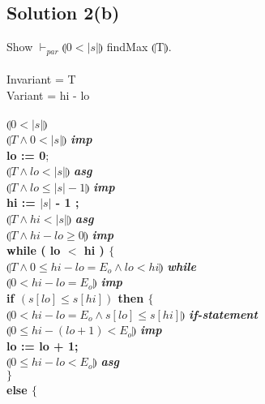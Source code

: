 \documentclass[12pt]{article}
\newcommand\abs[1]{\left|#1\right|}
\begin{document}
\subsection*{Solution 2(b)}
Show $\vdash_{par} \limg 0 < \abs{s} \rimg$ findMax $\limg $T$ \rimg$. \\ \\
Invariant = T \\
Variant = hi - lo \\ \\
$\limg 0 < \abs{s} \rimg$ 	\\
$\limg T \land 0 < \abs{s} \rimg$ \textit{\textbf{imp}} \\ 					
\textbf{lo := 0};  \\
$\limg T \land lo < \abs{s} \rimg$	\textit{\textbf{asg}}\\
$\limg T \land lo \leq \abs{s} - 1 \rimg$	\textit{\textbf{imp}}\\
\textbf{hi := $\abs{s}$ - 1 ;} \\
$\limg T \land hi < \abs{s} \rimg$	\textit{\textbf{asg}}\\
$\limg T \land hi - lo \geq 0 \rimg$ \textit{\textbf{imp}}\\
\textbf{while ( lo $<$ hi ) $\{$} \\
\hspace*{10mm}$\limg T \land 0 \leq hi - lo = E_o \land lo < hi \rimg$ \textit{\textbf{while}}\\
\hspace*{10mm}$\limg 0 < hi - lo = E_o \rimg$ \textit{\textbf{imp}}\\
\hspace*{10mm}\textbf{if $(s[lo] \leq s[hi])$ then $\{$} \\
\hspace*{20mm}$\limg 0 < hi - lo = E_o \land s[lo] \leq s[hi] \rimg$ \textit{\textbf{if-statement}}\\
\hspace*{20mm}$\limg 0 \leq hi - (lo + 1) < E_o \rimg$ \textit{\textbf{imp}}\\
\hspace*{20mm}\textbf{lo := lo + 1;} \\
\hspace*{20mm}$\limg 0 \leq hi - lo < E_o \rimg$ \textit{\textbf{asg}}\\
\hspace*{10mm}\textbf{$\}$} \\
\hspace*{10mm}\textbf{else $\{$} \\
\end{document}
